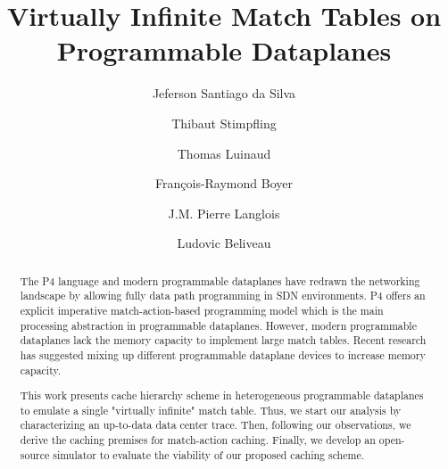 \documentclass[sigconf,natbib=false,anonymous=false,screen]{acmart}
\begin{document}
\title{Virtually Infinite Match Tables on Programmable Dataplanes}

\author{Jeferson Santiago da Silva}


\author{Thibaut Stimpfling}

\author{Thomas Luinaud}

\author{Fran\c{c}ois-Raymond Boyer}


\author{J.M. Pierre Langlois}

\author{Ludovic Beliveau}



\begin{abstract}
The P4 language and modern programmable dataplanes have redrawn the networking landscape by allowing fully data path programming in SDN environments.
P4 offers an explicit imperative match-action-based programming model which is the main processing abstraction in programmable dataplanes.
However, modern programmable dataplanes lack the memory capacity to implement large match tables.
Recent research has suggested mixing up different programmable dataplane devices to increase memory capacity.

This work presents cache hierarchy scheme in heterogeneous programmable dataplanes to emulate a single "virtually infinite" match table.
Thus, we start our analysis by characterizing an up-to-data data center trace.
Then, following our observations, we derive the caching premises for match-action caching.
Finally, we develop an open-source simulator to evaluate the viability of our proposed caching scheme.

\end{abstract}
\end{document}
